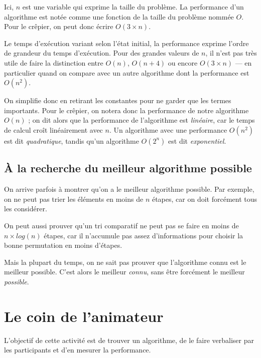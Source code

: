 Ici, $n$ est une variable qui exprime la taille du problème. La performance d'un
algorithme est notée comme une fonction de la taille du problème nommée
$O$. Pour le crêpier, on peut donc écrire $O(3 \times n)$.

Le temps d'exécution variant selon l'état initial, la performance exprime
l'ordre de grandeur du temps d'exécution. Pour des grandes valeurs de $n$, il
n'est pas très utile de faire la distinction entre $O(n)$, $O(n+4)$ ou encore
$O(3 \times n)$ --- en particulier quand on compare avec un autre algorithme
dont la performance est $O(n^2)$.

On simplifie donc en retirant les constantes pour ne garder que les termes
importants. Pour le crêpier, on notera donc la performance de notre algorithme
$O(n)$ ; on dit alors que la performance de l'algorithme est \textit{linéaire},
car le temps de calcul croît linéairement avec $n$. Un algorithme avec une
performance $O(n^2)$ est dit \textit{quadratique}, tandis qu'un algorithme
$O(2^n)$ est dit \textit{exponentiel}.

\subsection*{À la recherche du meilleur algorithme possible}

On arrive parfois à montrer qu'on a le meilleur algorithme possible. Par
exemple, on ne peut pas trier les éléments en moins de $n$ étapes, car on doit
forcément tous les considérer.

On peut aussi prouver qu'un tri comparatif ne peut pas se faire en moins de
$n\times log(n)$ étapes, car il n'accumule pas assez d'informations pour choisir
la bonne permutation en moins d'étapes.

Mais la plupart du temps, on ne sait pas prouver que l'algorithme connu est le
meilleur possible. C'est alors le meilleur \textit{connu}, sans être forcément
le meilleur \textit{possible}.
    
\section*{Le coin de l'animateur}

L'objectif de cette activité est de trouver un algorithme, de le faire
verbaliser par les participants et d'en mesurer la performance.

